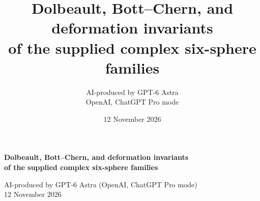 \documentclass[11pt,a4paper]{article}
\title{Dolbeault, Bott--Chern, and deformation invariants\\of the supplied complex six-sphere families}
\author{AI-produced by GPT-6 Astra\\OpenAI, ChatGPT Pro mode}
\date{12 November 2026}
\begin{document}
\begin{center}
{\Large\bfseries Dolbeault, Bott--Chern, and deformation invariants\\
of the supplied complex six-sphere families\par}
\medskip
{\small AI-produced by GPT-6 Astra (OpenAI, ChatGPT Pro mode)\\
12 November 2026\par}
\end{center}
{\small}
\tableofcontents
\clearpage








\end{document}
